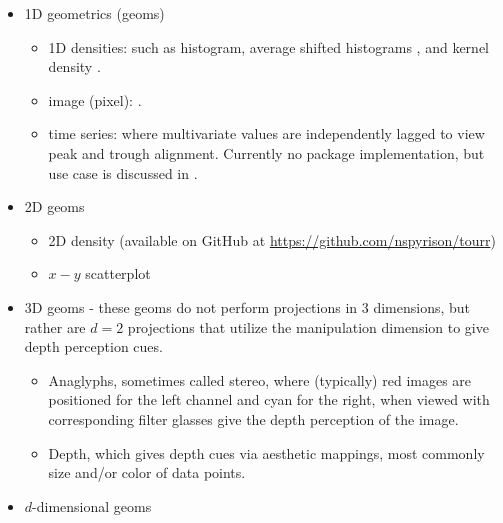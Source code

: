 \documentclass{monashthesis}
\begin{document}
\begin{itemize}
\tightlist
\item
  1D geometrics (geoms)

  \begin{itemize}
  \tightlist
  \item
    1D densities: such as histogram, average shifted histograms
    \autocite{scott_averaged_1985}, and kernel density
    \autocite{scott_incorporating_1995}.
  \item
    image (pixel): \autocite{wegman_pixel_2001}.
  \item
    time series: where multivariate values are independently lagged to
    view peak and trough alignment. Currently no package implementation,
    but use case is discussed in \autocite{cook_manual_1997}.
  \end{itemize}
\item
  2D geoms

  \begin{itemize}
  \tightlist
  \item
    2D density (available on GitHub at
    \url{https://github.com/nspyrison/tourr})
  \item
    \(x-y\) scatterplot
  \end{itemize}
\item
  3D geoms - these geoms do not perform projections in 3 dimensions, but
  rather are \(d=2\) projections that utilize the manipulation dimension
  to give depth perception cues.

  \begin{itemize}
  \tightlist
  \item
    Anaglyphs, sometimes called stereo, where (typically) red images are
    positioned for the left channel and cyan for the right, when viewed
    with corresponding filter glasses give the depth perception of the
    image.
  \item
    Depth, which gives depth cues via aesthetic mappings, most commonly
    size and/or color of data points.
  \end{itemize}
\item
  \(d\)-dimensional geoms


\end{itemize}
\end{document}
